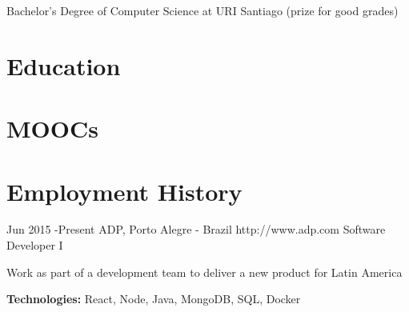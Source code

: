 \documentclass[10pt]{article} %
\begin{document}
Bachelor's Degree of Computer Science at URI Santiago (prize for good grades)


\section{Education}



\section{MOOCs}






\section{Employment History}

\job
{Jun 2015 -}{Present}
{ADP, Porto Alegre - Brazil}
{http://www.adp.com}
{Software Developer I}
{Work as part of a development team to deliver a new product for Latin America \\
\rule{0mm}{5mm}\textbf{Technologies:} React, Node, Java, MongoDB, SQL, Docker}

\end{document}
